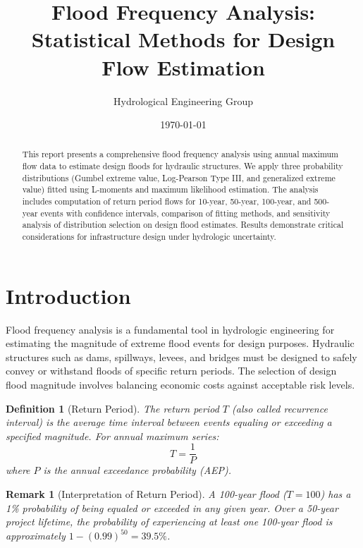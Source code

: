 \documentclass[a4paper, 11pt]{article}
\title{Flood Frequency Analysis: Statistical Methods for Design Flow Estimation}
\author{Hydrological Engineering Group}
\date{\today}
\newtheorem{definition}{Definition}[section]
\newtheorem{remark}{Remark}[section]
\begin{document}
\maketitle

\begin{abstract}
This report presents a comprehensive flood frequency analysis using annual maximum flow data
to estimate design floods for hydraulic structures. We apply three probability distributions
(Gumbel extreme value, Log-Pearson Type III, and generalized extreme value) fitted using
L-moments and maximum likelihood estimation. The analysis includes computation of return period
flows for 10-year, 50-year, 100-year, and 500-year events with confidence intervals,
comparison of fitting methods, and sensitivity analysis of distribution selection on design
flood estimates. Results demonstrate critical considerations for infrastructure design under
hydrologic uncertainty.
\end{abstract}

\section{Introduction}

Flood frequency analysis is a fundamental tool in hydrologic engineering for estimating the
magnitude of extreme flood events for design purposes. Hydraulic structures such as dams,
spillways, levees, and bridges must be designed to safely convey or withstand floods of
specific return periods. The selection of design flood magnitude involves balancing economic
costs against acceptable risk levels.

\begin{definition}[Return Period]
The return period $T$ (also called recurrence interval) is the average time interval between
events equaling or exceeding a specified magnitude. For annual maximum series:
\begin{equation}
T = \frac{1}{P}
\end{equation}
where $P$ is the annual exceedance probability (AEP).
\end{definition}

\begin{remark}[Interpretation of Return Period]
A 100-year flood ($T = 100$) has a 1\% probability of being equaled or exceeded in any given
year. Over a 50-year project lifetime, the probability of experiencing at least one 100-year
flood is approximately $1 - (0.99)^{50} = 39.5\%$.
\end{remark}
\end{document}
